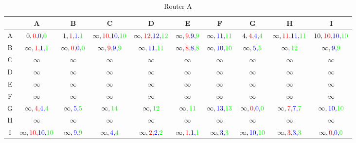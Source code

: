 \documentclass[a4paper,10pt]{article}
\begin{document}
\begin{table}[H]
\centering
\begin{tabular}{|c|c|c|c|c|c|c|c|c|c|} \hline
    & A & B & C & D & E & F & G & H & I  \\\hline
A & $ 0,{\color{red}0,}{\color{blue}0,}{\color{green}0} $ & $1,{\color{red}1,}{\color{blue}1,}{\color{green}1} $ & $ \infty,{\color{red}10,}{\color{blue}10,}{\color{green}10} $ & $ \infty,{\color{red}12,}{\color{blue}12,}{\color{green}12} $ & $ \infty,{\color{red}9,}{\color{blue}9,}{\color{green}9} $ & $ \infty,{\color{blue}11,}{\color{green}11} $ & $ 4,{\color{red}4,}{\color{blue}4,}{\color{green}4} $ & $ \infty,{\color{red}11,}{\color{blue}11,}{\color{green}11} $ & $10,{\color{red}10,}{\color{blue}10,}{\color{green}10} $ \\\hline
B & $ \infty,{\color{red}1,}{\color{blue}1,}{\color{green}1} $ & $ \infty,{\color{red}0,}{\color{blue}0,}{\color{green}0} $ & $ \infty,{\color{red}9,}{\color{blue}9,}{\color{green}9} $ & $ \infty,{\color{blue}11,}{\color{green}11} $ & $ \infty,{\color{red}8,}{\color{blue}8,}{\color{green}8} $ & $ \infty,{\color{blue}10,}{\color{green}10} $ & $ \infty,{\color{blue}5,}{\color{green}5} $ & $ \infty,{\color{green}12} $ & $ \infty,{\color{blue}9,}{\color{green}9} $ \\\hline
C & $ \infty $ & $ \infty $ & $ \infty $ & $ \infty $ & $ \infty $ & $ \infty $ & $ \infty $ & $ \infty $ & $ \infty $ \\\hline
D & $ \infty $ & $ \infty $ & $ \infty $ & $ \infty $ & $ \infty $ & $ \infty $ & $ \infty $ & $ \infty $ & $ \infty $ \\\hline
E & $ \infty $ & $ \infty $ & $ \infty $ & $ \infty $ & $ \infty $ & $ \infty $ & $ \infty $ & $ \infty $ & $ \infty $ \\\hline
F & $ \infty $ & $ \infty $ & $ \infty $ & $ \infty $ & $ \infty $ & $ \infty $ & $ \infty $ & $ \infty $ & $ \infty $ \\\hline
G & $ \infty,{\color{red}4,}{\color{blue}4,}{\color{green}4} $ & $ \infty,{\color{blue}5,}{\color{green}5} $ & $ \infty,{\color{green}14} $ & $ \infty,{\color{green}12} $ & $ \infty,{\color{green}11} $ & $ \infty,{\color{blue}13,}{\color{green}13} $ & $ \infty,{\color{red}0,}{\color{blue}0,}{\color{green}0} $ & $ \infty,{\color{red}7,}{\color{blue}7,}{\color{green}7} $ & $ \infty,{\color{blue}10,}{\color{green}10} $ \\\hline
H & $ \infty $ & $ \infty $ & $ \infty $ & $ \infty $ & $ \infty $ & $ \infty $ & $ \infty $ & $ \infty $ & $ \infty $ \\\hline
I & $  \infty,{\color{red}10,}{\color{blue}10,}{\color{green}10}$ & $ \infty,{\color{blue}9,}{\color{green}9} $ & $ \infty,{\color{blue}4,}{\color{green}4} $ & $ \infty,{\color{red}2,}{\color{blue}2,}{\color{green}2} $ & $ \infty,{\color{red}1,}{\color{blue}1,}{\color{green}1} $ & $ \infty,{\color{blue}3,}{\color{green}3} $ & $ \infty,{\color{blue}10,}{\color{green}10} $ & $ \infty,{\color{red}3,}{\color{blue}3,}{\color{green}3} $ & $  \infty,{\color{red}0,}{\color{blue}0,}{\color{green}0}$ \\\hline
\end{tabular}
\caption{Router A}
\end{table} \\
\end{document}
